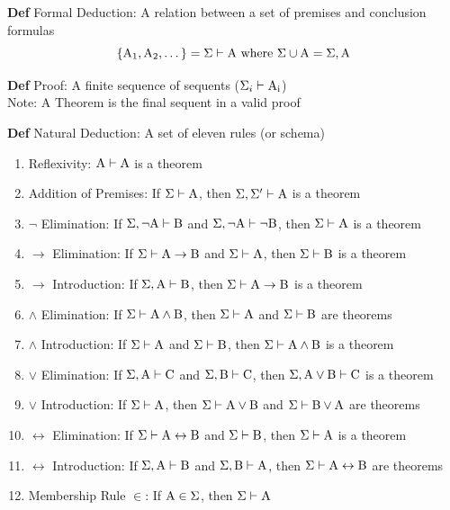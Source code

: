 \documentclass[11pt,notitlepage]{report}
\begin{document}
\textbf{Def} Formal Deduction: A relation between a set of premises and conclusion formulas
$$\{\rm A_1, \rm A_2, \dots\} = \Sigma \vdash \rm A \text{ where }\Sigma \cup \rm A = \Sigma, \rm A$$

\textbf{Def} Proof: A finite sequence of sequents ($\Sigma_i \vdash \rm A_i$)\\
\hspace*{5mm} Note: A Theorem is the final sequent in a valid proof

\textbf{Def} Natural Deduction: A set of eleven rules (or schema)
\begin{enumerate}
    \item Reflexivity: $\rm A \vdash \rm A$ is a theorem
    \item Addition of Premises: If $\Sigma \vdash \rm A$, then $\Sigma, \Sigma' \vdash \rm A$ is a theorem
    \item $\neg$ Elimination: If $\Sigma, \neg \rm A \vdash \rm B$ and $\Sigma, \neg \rm A \vdash \neg \rm B$, then $\Sigma \vdash \rm A$ is a theorem
    \item $\to$ Elimination: If $\Sigma \vdash \rm A \to \rm B$ and $\Sigma \vdash \rm A$, then $\Sigma \vdash \rm B$ is a theorem
    \item $\to$ Introduction: If $\Sigma, \rm A \vdash \rm B$, then $\Sigma \vdash \rm A \to \rm B$ is a theorem
    \item $\wedge$ Elimination: If $\Sigma \vdash \rm A \wedge \rm B$, then $\Sigma \vdash \rm A$ and $\Sigma \vdash \rm B$ are theorems
    \item $\wedge$ Introduction: If $\Sigma \vdash \rm A$ and $\Sigma \vdash \rm B$, then $\Sigma \vdash \rm A \wedge \rm B$ is a theorem
    \item $\vee$ Elimination: If $\Sigma, \rm A \vdash \rm C$ and $\Sigma, \rm B \vdash \rm C$, then $\Sigma, \rm A \vee \rm B \vdash \rm C$ is a theorem
    \item $\vee$ Introduction: If $\Sigma \vdash \rm A$, then $\Sigma \vdash \rm A \vee \rm B$ and $\Sigma \vdash \rm B \vee A$ are theorems
    \item $\leftrightarrow$ Elimination: If $\Sigma \vdash \rm A \leftrightarrow \rm B$ and $\Sigma \vdash \rm B$, then $\Sigma \vdash \rm A$ is a theorem
    \item $\leftrightarrow$ Introduction: If $\Sigma, \rm A \vdash \rm B$ and $\Sigma, \rm B \vdash \rm A$, then $\Sigma \vdash \rm A \leftrightarrow \rm B$ are theorems
    \item Membership Rule $\in$: If $\rm A \in \Sigma$, then $\Sigma \vdash \rm A$
\end{enumerate}
\end{document}

